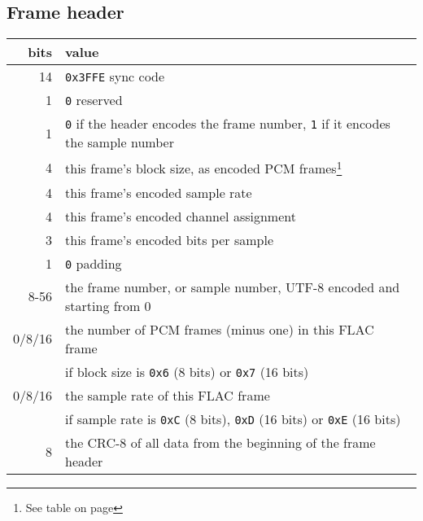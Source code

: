 \subsection{Frame header}
\begin{minipage}{\linewidth}
\renewcommand\thefootnote{\thempfootnote}
\begin{tabular}{|r|l|}
\hline
bits & value \\
\hline
14 & \texttt{0x3FFE} sync code \\
1 & \texttt{0} reserved \\
1 & \texttt{0} if the header encodes the frame number, \texttt{1} if it encodes the sample number \\
4 & this frame's block size, as encoded PCM frames\footnote{See table on page \pageref{flac_encoded_fields}} \\
4 & this frame's encoded sample rate\footnotemark[\value{mpfootnote}] \\
4 & this frame's encoded channel assignment\footnotemark[\value{mpfootnote}] \\
3 & this frame's encoded bits per sample\footnotemark[\value{mpfootnote}] \\
1 & \texttt{0} padding \\
8-56 & the frame number, or sample number, UTF-8 encoded and starting from 0 \\
0/8/16 & the number of PCM frames (minus one) in this FLAC frame \\
& if block size is \texttt{0x6} (8 bits) or \texttt{0x7} (16 bits) \\
0/8/16 & the sample rate of this FLAC frame \\
& if sample rate is \texttt{0xC} (8 bits), \texttt{0xD} (16 bits) or \texttt{0xE} (16 bits) \\
8 & the CRC-8 of all data from the beginning of the frame header \\
\hline
\end{tabular}
\end{minipage}

\vspace{2ex}


